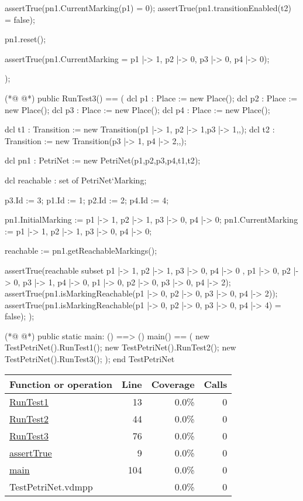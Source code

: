\begin{vdmpp}
  assertTrue(pn1.CurrentMarking(p1) = 0);
  assertTrue(pn1.transitionEnabled(t2) = false);
  
  pn1.reset();
  
  assertTrue(pn1.CurrentMarking = {p1 |-> 1, p2 |-> 0, p3 |-> 0, p4 |-> 0});
  
 );
 
(*@
\label{RunTest3:76}
@*)
 public RunTest3() == (
  dcl p1 : Place := new Place();
  dcl p2 : Place := new Place();
  dcl p3 : Place := new Place();
  dcl p4 : Place := new Place();
  
  dcl t1 : Transition := new Transition({p1 |-> 1, p2 |-> 1},{p3 |-> 1},{},{});
  dcl t2 : Transition := new Transition({p3 |-> 1}, {p4 |-> 2},{},{});
  
  dcl pn1 : PetriNet := new PetriNet({p1,p2,p3,p4},{t1,t2});
  
  dcl reachable : set of PetriNet`Marking;
  
  p3.Id := 3;
  p1.Id := 1;
  p2.Id := 2;
  p4.Id := 4;
  
  pn1.InitialMarking := {p1 |-> 1, p2 |-> 1, p3 |-> 0, p4 |-> 0};
  pn1.CurrentMarking := {p1 |-> 1, p2 |-> 1, p3 |-> 0, p4 |-> 0};
  
  reachable := pn1.getReachableMarkings();
  
  assertTrue(reachable subset { {p1 |-> 1, p2 |-> 1, p3 |-> 0, p4 |-> 0} , {p1 |-> 0, p2 |-> 0, p3 |-> 1, p4 |-> 0}, {p1 |-> 0, p2 |-> 0, p3 |-> 0, p4 |-> 2}});
  assertTrue(pn1.isMarkingReachable({p1 |-> 0, p2 |-> 0, p3 |-> 0, p4 |-> 2}));
  assertTrue(pn1.isMarkingReachable({p1 |-> 0, p2 |-> 0, p3 |-> 0, p4 |-> 4}) = false);
 );
 
(*@
\label{main:104}
@*)
 public static main: () ==> ()
 main() == (
  new TestPetriNet().RunTest1();
  new TestPetriNet().RunTest2();
  new TestPetriNet().RunTest3();
 );
end TestPetriNet
\end{vdmpp}
\bigskip
\begin{longtable}{|l|r|r|r|}
\hline
Function or operation & Line & Coverage & Calls \\
\hline
\hline
\hyperref[RunTest1:13]{RunTest1} & 13&0.0\% & 0 \\
\hline
\hyperref[RunTest2:44]{RunTest2} & 44&0.0\% & 0 \\
\hline
\hyperref[RunTest3:76]{RunTest3} & 76&0.0\% & 0 \\
\hline
\hyperref[assertTrue:9]{assertTrue} & 9&0.0\% & 0 \\
\hline
\hyperref[main:104]{main} & 104&0.0\% & 0 \\
\hline
\hline
TestPetriNet.vdmpp & & 0.0\% & 0 \\
\hline
\end{longtable}

